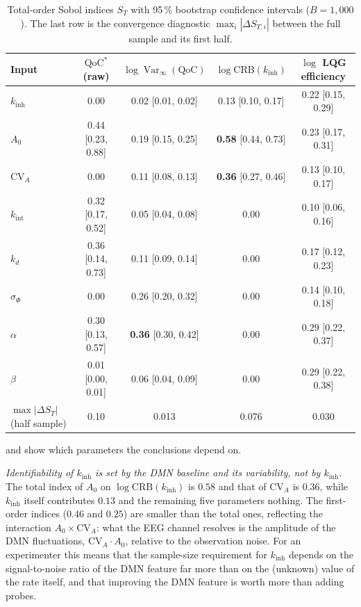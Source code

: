 \documentclass[12pt,a4paper]{article}
\theoremstyle{plain}
\theoremstyle{definition}
\theoremstyle{remark}
\newcommand{\QoC}{\mathrm{QoC}}
\newcommand{\kinh}{k_{\mathrm{inh}}}
\newcommand{\kint}{k_{\mathrm{int}}}
\newcommand{\kd}{k_{d}}
\newcommand{\sPhi}{\sigma_{\Phi}}
\newcommand{\CRB}{\mathrm{CRB}}
\newcommand{\Var}{\operatorname{Var}}
\begin{document}
\begin{table}[t]
\centering\small
\caption{Total-order Sobol indices $S_T$ with 95\,\% bootstrap confidence intervals ($B=1{,}000$). The last row is the convergence diagnostic $\max_i|\Delta S_{T,i}|$ between the full sample and its first half.}
\label{tab:sobol}
\footnotesize\setlength{\tabcolsep}{4pt}
\begin{tabular}{lcccc}
\toprule
Input & $\QoC^*$ (raw) & $\log\Var_\infty(\QoC)$ & $\log\CRB(\kinh)$ & $\log$ LQG efficiency \\
\midrule
$\kinh$          & 0.00 & 0.02 [0.01, 0.02] & 0.13 [0.10, 0.17] & 0.22 [0.15, 0.29] \\
$A_0$            & 0.44 [0.23, 0.88] & 0.19 [0.15, 0.25] & \textbf{0.58} [0.44, 0.73] & 0.23 [0.17, 0.31] \\
$\mathrm{CV}_A$  & 0.00 & 0.11 [0.08, 0.13] & \textbf{0.36} [0.27, 0.46] & 0.13 [0.10, 0.17] \\
$\kint$          & 0.32 [0.17, 0.52] & 0.05 [0.04, 0.08] & 0.00 & 0.10 [0.06, 0.16] \\
$\kd$            & 0.36 [0.14, 0.73] & 0.11 [0.09, 0.14] & 0.00 & 0.17 [0.12, 0.23] \\
$\sPhi$          & 0.00 & 0.26 [0.20, 0.32] & 0.00 & 0.14 [0.10, 0.18] \\
$\alpha$         & 0.30 [0.13, 0.57] & \textbf{0.36} [0.30, 0.42] & 0.00 & 0.29 [0.22, 0.37] \\
$\beta$          & 0.01 [0.00, 0.01] & 0.06 [0.04, 0.09] & 0.00 & 0.29 [0.22, 0.38] \\
\midrule
$\max|\Delta S_T|$ (half sample) & 0.10 & 0.013 & 0.076 & 0.030 \\
\bottomrule
\end{tabular}
\end{table}

 and  show which parameters the conclusions depend on.

\emph{Identifiability of $\kinh$ is set by the DMN baseline and its variability, not by $\kinh$.} The total index of $A_0$ on $\log\CRB(\kinh)$ is $0.58$ and that of $\mathrm{CV}_A$ is $0.36$, while $\kinh$ itself contributes $0.13$ and the remaining five parameters nothing. The first-order indices ($0.46$ and $0.25$) are smaller than the total ones, reflecting the interaction $A_0\times\mathrm{CV}_A$: what the EEG channel resolves is the amplitude of the DMN fluctuations, $\mathrm{CV}_A\cdot A_0$, relative to the observation noise. For an experimenter this means that the sample-size requirement for $\kinh$ depends on the signal-to-noise ratio of the DMN feature far more than on the (unknown) value of the rate itself, and that improving the DMN feature is worth more than adding probes.
\end{document}
